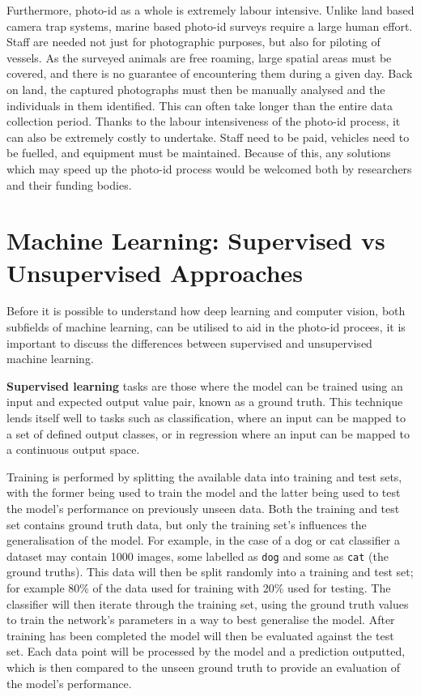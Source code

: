 Furthermore, photo-id as a whole is extremely labour intensive. Unlike land based camera trap systems, marine based photo-id surveys require a large human effort. Staff are needed not just for photographic purposes, but also for piloting of vessels. As the surveyed animals are free roaming, large spatial areas must be covered, and there is no guarantee of encountering them during a given day. Back on land, the captured photographs must then be manually analysed and the individuals in them identified. This can often take longer than the entire data collection period. Thanks to the labour intensiveness  of the photo-id process, it can also be extremely costly to undertake. Staff need to be paid, vehicles need to be fuelled, and equipment must be maintained. Because of this, any solutions which may speed up the photo-id process would be welcomed both by researchers and their funding bodies. 

\section{Machine Learning: Supervised vs Unsupervised Approaches}\label{ch:Background,sec:DLIntro,sub:supervisedVsUnsupervisedLearning}

Before it is possible to understand how deep learning and computer vision, both subfields of machine learning, can be utilised to aid in the photo-id procees, it is important to discuss the differences between supervised and unsupervised machine learning.

\textbf{Supervised learning} tasks are those where the model can be trained using an input and expected output value pair, known as a ground truth. This technique lends itself well to tasks such as classification, where an input can be mapped to a set of defined output classes, or in regression where an input can be mapped to a continuous output space. 

Training is performed by splitting the available data into training and test sets, with the former being used to train the model and the latter being used to test the model's performance on previously unseen data. Both the training and test set contains ground truth data, but only the training set's influences the generalisation of the model. For example, in the case of a dog or cat classifier a dataset may contain 1000 images, some labelled as \texttt{dog} and some as \texttt{cat} (the ground truths). This data will then be split randomly into a training and test set; for example 80\% of the data used for training with 20\% used for testing. The classifier will then iterate through the training set, using the ground truth values to train the network's parameters in a way to best generalise the model. After training has been completed the model will then be evaluated against the test set. Each data point will be processed by the model and a prediction outputted, which is then compared to the unseen ground truth to provide an evaluation of the model's performance.


